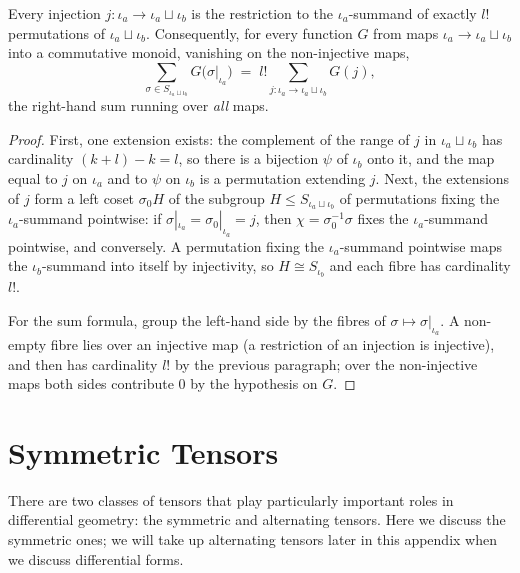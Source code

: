 \begin{lemma}
\label{lem:perm-extension-count}




Every injection $j \colon \iota_a \to \iota_a \sqcup \iota_b$ is the restriction to the $\iota_a$-summand of exactly $l!$ permutations of $\iota_a \sqcup \iota_b$. Consequently, for every function $G$ from maps $\iota_a \to \iota_a \sqcup \iota_b$ into a commutative monoid, vanishing on the non-injective maps,
\[
\sum_{\sigma \in S_{\iota_a \sqcup \iota_b}} G\big(\sigma|_{\iota_a}\big) \;=\; l! \sum_{j \colon \iota_a \to \iota_a \sqcup \iota_b} G(j),
\]
the right-hand sum running over \emph{all} maps.
\end{lemma}
\begin{proof}

First, one extension exists: the complement of the range of $j$ in $\iota_a \sqcup \iota_b$ has cardinality $(k+l) - k = l$, so there is a bijection $\psi$ of $\iota_b$ onto it, and the map equal to $j$ on $\iota_a$ and to $\psi$ on $\iota_b$ is a permutation extending $j$. Next, the extensions of $j$ form a left coset $\sigma_0 H$ of the subgroup $H \le S_{\iota_a \sqcup \iota_b}$ of permutations fixing the $\iota_a$-summand pointwise: if $\sigma|_{\iota_a} = \sigma_0|_{\iota_a} = j$, then $\chi = \sigma_0^{-1}\sigma$ fixes the $\iota_a$-summand pointwise, and conversely. A permutation fixing the $\iota_a$-summand pointwise maps the $\iota_b$-summand into itself by injectivity, so $H \cong S_{\iota_b}$ and each fibre has cardinality $l!$.

For the sum formula, group the left-hand side by the fibres of $\sigma \mapsto \sigma|_{\iota_a}$. A non-empty fibre lies over an injective map (a restriction of an injection is injective), and then has cardinality $l!$ by the previous paragraph; over the non-injective maps both sides contribute $0$ by the hypothesis on $G$.
\end{proof}

\section{Symmetric Tensors}

There are two classes of tensors that play particularly important roles in differential geometry: the symmetric and alternating tensors. Here we discuss the symmetric ones; we will take up alternating tensors later in this appendix when we discuss differential forms.


